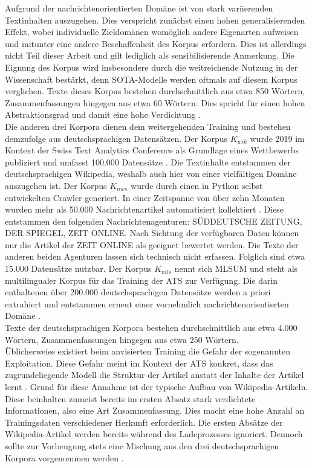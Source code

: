 \noindent
Aufgrund der nachrichtenorientierten Domäne ist von stark variierenden Textinhalten auszugehen. Dies verspricht zunächst einen hohen generalisierenden Effekt, wobei individuelle Zieldomänen womöglich andere Eigenarten aufweisen und mitunter eine andere Beschaffenheit des Korpus erfordern. Dies ist allerdings nicht Teil dieser Arbeit und gilt lediglich als sensibilisierende Anmerkung. Die Eignung des Korpus wird insbesondere durch die weitreichende Nutzung in der Wissenschaft bestärkt, denn \ac{SOTA}-Modelle werden oftmals auf diesem Korpus verglichen. Texte dieses Korpus bestehen durchschnittlich aus etwa 850 Wörtern, Zusammenfassungen hingegen aus etwa 60 Wörtern. Dies spricht für einen hohen Abstraktionsgrad und damit eine hohe Verdichtung \cite[S.~6]{ROT20}.\\

\noindent
Die anderen drei Korpora dienen dem weitergehenden Training und bestehen demzufolge aus deutschsprachigen Datensätzen. Der Korpus $K_{wik}$ wurde 2019 im Kontext der Swiss Text Analytics Conference als Grundlage eines Wettbewerbs publiziert und umfasst 100.000 Datensätze \cite{CIE19}. Die Textinhalte entstammen der deutschsprachigen Wikipedia, weshalb auch hier von einer vielfältigen Domäne auszugehen ist. Der Korpus $K_{nws}$ wurde durch einen in Python selbst entwickelten Crawler generiert. In einer Zeitspanne von über zehn Monaten wurden mehr als 50.000 Nachrichtenartikel automatisiert kollektiert \cite[S.~79,~83,~416]{BIR09}. Diese entstammen den folgenden Nachrichtenagenturen: SÜDDEUTSCHE ZEITUNG, DER SPIEGEL, ZEIT ONLINE. Nach Sichtung der verfügbaren Daten können nur die Artikel der ZEIT ONLINE als geeignet bewertet werden. Die Texte der anderen beiden Agenturen lassen sich technisch nicht erfassen. Folglich sind etwa 15.000 Datensätze nutzbar. Der Korpus $K_{mls}$ nennt sich MLSUM und steht als multilingualer Korpus für das Training der \ac{ATS} zur Verfügung. Die darin enthaltenen über 200.000 deutschsprachigen Datensätze werden a priori extrahiert und entstammen erneut einer vornehmlich nachrichtenorientierten Domäne \cite{SCI20}.\\

\noindent
Texte der deutschsprachigen Korpora bestehen durchschnittlich aus etwa 4.000 Wörtern, Zusammenfassungen hingegen aus etwa 250 Wörtern.\\

\noindent
Üblicherweise existiert beim anvisierten Training die Gefahr der sogenannten Exploitation. Diese Gefahr meint im Kontext der \ac{ATS} konkret, dass das zugrundeliegende Modell die Struktur der Artikel anstatt der Inhalte der Artikel lernt \cite[S.~476]{GOO16}. Grund für diese Annahme ist der typische Aufbau von Wikipedia-Artikeln. Diese beinhalten zumeist bereits im ersten Absatz stark verdichtete Informationen, also eine Art Zusammenfassung. Dies macht eine hohe Anzahl an Trainingsdaten verschiedener Herkunft erforderlich. Die ersten Absätze der Wikipedia-Artikel werden bereits während des Ladeprozesses ignoriert. Dennoch sollte zur Vorbeugung stets eine Mischung aus den drei deutschsprachigen Korpora vorgenommen werden \cite[S.~42]{BIR09}.\\

